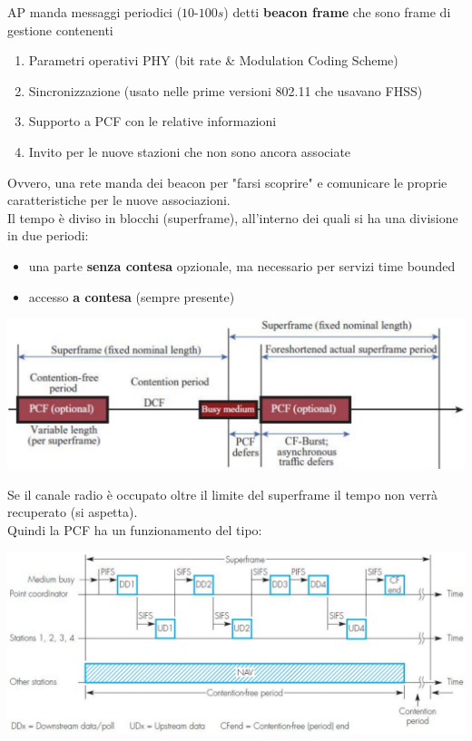 AP manda messaggi periodici ($10$-$100s$) detti \textbf{beacon frame} che sono frame di gestione contenenti
\begin{enumerate}
	\item Parametri operativi PHY (bit rate \& Modulation Coding Scheme)
	\item Sincronizzazione (usato nelle prime versioni 802.11 che usavano FHSS)
	\item Supporto a PCF con le relative informazioni
	\item Invito per le nuove stazioni che non sono ancora associate
\end{enumerate}
Ovvero, una rete manda dei beacon per "farsi scoprire" e comunicare le proprie caratteristiche per le nuove associazioni.\\

Il tempo è diviso in blocchi (superframe), all'interno dei quali si ha una divisione in due periodi:
\begin{itemize}
	\item una parte \textbf{senza contesa} opzionale, ma necessario per servizi time bounded
	\item accesso \textbf{a contesa} (sempre presente)
\end{itemize}
\begin{center}
	\includegraphics[width=0.95\linewidth]{img/wlan/superframe}
\end{center}
Se il canale radio è occupato oltre il limite del superframe il tempo non verrà recuperato (si aspetta).\\

Quindi la PCF ha un funzionamento del tipo:
\begin{center}
	\includegraphics[width=0.98\linewidth]{img/wlan/pcf1}
\end{center}

